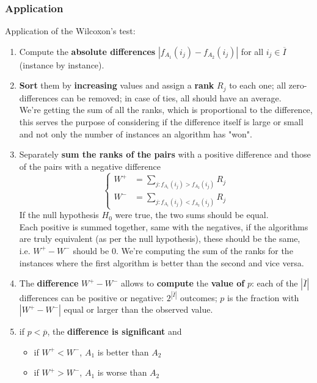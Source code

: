 \subsubsection{Application}
Application of the Wilcoxon's test: 
\begin{enumerate}
	\item Compute the \textbf{absolute differences} $| f_{A_1} (i_j) − f_{A_2} (i_j)|$ for all $i_j \in \overline{I}$ (instance by instance).\\
	
	\item \textbf{Sort} them by \textbf{increasing} values and assign a \textbf{rank} $R_j$ to each one; all zero-differences can be removed; in case of ties, all should have an average.\\
	We're getting the sum of all the ranks, which is proportional to the difference, this serves the purpose of considering if the difference itself is large or small and not only the number of instances an algorithm has "won".\\
	
	\item Separately \textbf{sum the ranks of the pairs} with a positive difference and those of the pairs with a negative difference
	$$ 
	\begin{cases}
		W^+ & = \sum_{j:f_{A_1} (i_j) > f_{A_2} (i_j)} R_j \\
		W^- & = \sum_{j:f_{A_1} (i_j) < f_{A_2} (i_j)} R_j
	\end{cases}
	$$
	If the null hypothesis $H_0$ were true, the two sums should be equal.\\
	Each positive is summed together, same with the negatives, if the algorithms are truly equivalent (as per the null hypothesis), these should be the same, i.e. $W^+ - W^-$ should be $0$. We're computing the sum of the ranks for the instances where the first algorithm is better than the second and vice versa.\\
	
	\item The \textbf{difference} $W^+ - W^-$ allows to \textbf{compute} the \textbf{value of} $p$: each of the $|\overline{I}|$ differences can be positive or negative: $2^{|\overline{I}|}$ outcomes; $p$ is the fraction with $|W^+ - W^-|$ equal or larger than the observed value.\\
	
	\item if $p < \overline{p}$, the \textbf{difference is significant} and
	\begin{itemize}
		\item if $W^+ < W^-$, $A_1$ is better than $A_2$
		\item if $W^+ > W^-$, $A_1$ is worse than $A_2$
	\end{itemize}
\end{enumerate}

